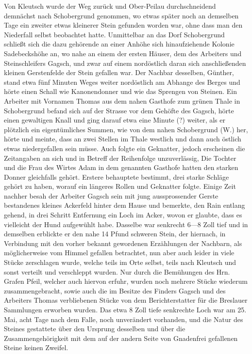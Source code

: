 \documentclass[a4paper, 11pt, oneside]{article}
\begin{document}
Von Kleutsch wurde der Weg zurück und Ober-Peilau durchschneidend demnächst nach Schobergrund genommen, wo etwas später noch an demselben Tage ein zweiter etwas kleinerer Stein gefunden worden war, ohne dass man den Niederfall selbst beobachtet hatte. Unmittelbar an das Dorf Schobergrund schließt sich die dazu gehörende an einer Anhöhe sich hinaufziehende Kolonie Sadebeckshöhe an, wo nahe an einem der ersten Häuser, dem des Arbeiters und Steinschleifers Gagsch, und zwar auf einem nordöstlich daran sich anschließenden kleinen Gerstenfelde der Stein gefallen war. Der Nachbar desselben, Günther, stand etwa fünf Minuten Weges weiter nordöstlich am Abhange des Berges und hörte einen Schall wie Kanonendonner und wie das Sprengen von Steinen. Ein Arbeiter mit Vornamen Thomas aus dem nahen Gasthofe zum grünen Thale in Schobergrund befand sich auf der Strasse vor dem Gehöfte des Gagsch, hörte einen gewaltigen Knall und ging darauf etwa eine Minute (?) weiter, als er plötzlich ein eigentümliches Summen, wie von dem nahen Schobergrund (W.) her, hörte und meinte, dass an zwei Stellen im Thale westlich und dann auch östlich etwas niedergefallen sein müsse. Auch folgte ein Geknatter, jedoch erscheinen die Zeitangaben an sich und in Betreff der Reihenfolge unzuverlässig, Die Tochter und die Frau des Wirtes Adam in dem genannten Gasthofe hatten den starken Donner gleichfalls gehört. Erstere behauptete bestimmt, drei starke Schläge gehört zu haben, worauf ein längeres Rollen und Geknatter folgte. Einige Zeit nachher besah der Arbeiter Gagsch sein mit jung aussprossender Gerste bestandenes kleines Ackerfeld hinter dem Hause und bemerkte, den Rain entlang gehend, in drei Schritt Entfernung ein Loch im Acker, wovon er glaubte, dass es vielleicht der Hund aufgewühlt habe. Dasselbe war senkrecht 6---8 Zoll tief und in demselben erblickte er den nahe 14 Pfund schweren Stein, der hiernach, in Verbindung mit den vorher bekannt gewordenen Erzählungen der Nachbarn, als möglicherweise vom Himmel gefallen betrachtet, nun aber auch leider in viele Stücke zerschlagen wurde, welche teils im Orte selbst, teils nach Kleutsch und sonst verteilt und verschleppt wurden. Nur durch die Bemühungen des Hrn. Grafen Pfeil, welcher auch hiervon erfuhr, wurden noch mehrere Stücke wiederum zusammengebracht, sowie auch die im Besitze des Finders Gagsch und des Arbeiters Thomas verbliebenen Stücke von dem Berichterstatter für die Breslauer Sammlungen erworben wurden. Das etwa 8 Zoll tiefe senkrechte Loch war am 25. Mai, acht Tage nach dem Falle, noch unverändert vorhanden, und die Natur des Steines gestattete über den Ursprung desselben und über die Zusammengehörigkeit mit dem auf der andern Seite von Gnadenfrei gefallenen Steine keinen Zweifel.
\end{document}
